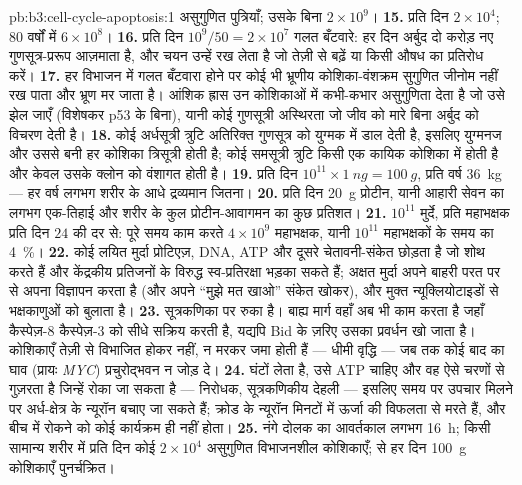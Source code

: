 \begin{solution}{pb:b3:cell-cycle-apoptosis:1}
असुगुणित पुत्रियाँ; उसके बिना $2\times 10^{9}$।
\textbf{15.} प्रति दिन $2\times 10^{4}$; $80$ वर्षों में $6\times 10^{8}$।
\textbf{16.} प्रति दिन $10^{9}/50 = 2\times 10^{7}$ गलत बँटवारे: हर
दिन अर्बुद दो करोड़ नए गुणसूत्र-प्ररूप आज़माता है, और चयन उन्हें रख
लेता है जो तेज़ी से बढ़ें या किसी औषध का प्रतिरोध करें।
\textbf{17.} हर विभाजन में गलत बँटवारा होने पर कोई भी भ्रूणीय
कोशिका-वंशक्रम सुगुणित जीनोम नहीं रख पाता और भ्रूण मर जाता है। आंशिक
ह्रास उन कोशिकाओं में कभी-कभार असुगुणिता देता है जो उसे झेल जाएँ
(विशेषकर p53 के बिना), यानी कोई गुणसूत्री अस्थिरता जो जीव को मारे बिना
अर्बुद को विचरण देती है।
\textbf{18.} कोई अर्धसूत्री त्रुटि अतिरिक्त गुणसूत्र को युग्मक में डाल
देती है, इसलिए युग्मनज और उससे बनी हर कोशिका त्रिसूत्री होती है; कोई
समसूत्री त्रुटि किसी एक कायिक कोशिका में होती है और केवल उसके क्लोन को
वंशागत होती है।
\textbf{19.} प्रति दिन $10^{11}\times \qty{1}{ng} = \qty{100}{g}$,
प्रति वर्ष \qty{36}{kg} --- हर वर्ष लगभग शरीर के आधे द्रव्यमान जितना।
\textbf{20.} प्रति दिन \qty{20}{g} प्रोटीन, यानी आहारी सेवन का लगभग
एक-तिहाई और शरीर के कुल प्रोटीन-आवागमन का कुछ प्रतिशत।
\textbf{21.} $10^{11}$ मुर्दे, प्रति महाभक्षक प्रति दिन $24$ की दर से:
पूरे समय काम करते $4\times
10^{9}$ महाभक्षक, यानी $10^{11}$ महाभक्षकों के समय का \qty{4}{\%}।
\textbf{22.} कोई लयित मुर्दा प्रोटिएज़, DNA, ATP और दूसरे
चेतावनी-संकेत छोड़ता है जो शोथ करते हैं और केंद्रकीय प्रतिजनों के
विरुद्ध स्व-प्रतिरक्षा भड़का सकते हैं; अक्षत मुर्दा अपने बाहरी परत पर
 से अपना विज्ञापन करता है (और अपने ``मुझे मत खाओ''
संकेत खोकर), और मुक्त न्यूक्लियोटाइडों से भक्षकाणुओं को बुलाता है।
\textbf{23.}  सूत्रकणिका पर रुका है। बाह्य मार्ग वहाँ अब भी
काम करता है जहाँ कैस्पेज़-8 कैस्पेज़-3 को सीधे सक्रिय करती है, यद्यपि
Bid के ज़रिए उसका प्रवर्धन खो जाता है। कोशिकाएँ तेज़ी से विभाजित होकर
नहीं, न मरकर जमा होती हैं --- धीमी वृद्धि --- जब तक कोई बाद का घाव
(प्रायः \emph{MYC}) प्रचुरोद्भवन न जोड़ दे।
\textbf{24.}  घंटों लेता है, उसे ATP चाहिए और वह ऐसे चरणों से
गुज़रता है जिन्हें रोका जा सकता है ---  निरोधक, सूत्रकणिकीय
देहली --- इसलिए समय पर उपचार मिलने पर अर्ध-क्षेत्र के न्यूरॉन बचाए जा
सकते हैं; क्रोड के न्यूरॉन मिनटों में ऊर्जा की विफलता से मरते हैं, और
बीच में रोकने को कोई कार्यक्रम ही नहीं होता।
\textbf{25.} नंगे दोलक का आवर्तकाल लगभग \qty{16}{h}; किसी सामान्य शरीर
में प्रति दिन कोई $2\times
10^{4}$ असुगुणित विभाजनशील कोशिकाएँ;  से हर दिन \qty{100}{g}
कोशिकाएँ पुनर्चक्रित।
\end{solution}
